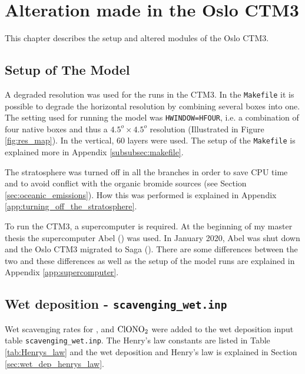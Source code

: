 \setcounter{chapter}{6}
\chapter{Alteration made in the Oslo CTM3}\label{chap:CTM3_Setup}

This chapter describes the setup and altered modules of the Oslo CTM3. 

\section{Setup of The Model}

A degraded resolution was used for the runs in the CTM3. In the \texttt{Makefile} it is possible to degrade the horizontal resolution by combining several boxes into one. The setting used for running the model was \texttt{HWINDOW=HFOUR}, i.e. a combination of four native boxes and thus a $4.5^o \times 4.5^o$ resolution (Illustrated in Figure \ref{fig:res_map}). In the vertical, 60 layers were used. The setup of the \texttt{Makefile} is explained more in Appendix \ref{subsubsec:makefile}. 

\medskip

The stratosphere was turned off in all the branches in order to save CPU time and to avoid conflict with the organic bromide sources (see Section \ref{sec:oceanic_emissions}). How this was performed is explained in Appendix \ref{app:turning_off_the_stratosphere}. 




\medskip

To run the CTM3, a supercomputer is required. At the beginning of my master thesis the supercomputer Abel (\cite{abel}) was used. In January 2020, Abel was shut down and the Oslo CTM3 migrated to Saga (\cite{saga}). There are some differences between the two  and these differences as well as the setup of the model runs are explained in Appendix \ref{app:supercomputer}. 


\section{Wet deposition - \texttt{scavenging\_wet.inp}}\label{sec:scav_wet}

Wet scavenging rates for ,  and $\mathrm{ClONO_2}$ were added to the wet deposition input table \texttt{scavenging\_wet.inp}. The Henry's law constants are listed in Table \ref{tab:Henrys_law} and the wet deposition and Henry's law is explained in Section \ref{sec:wet_dep_henrys_law}. 

